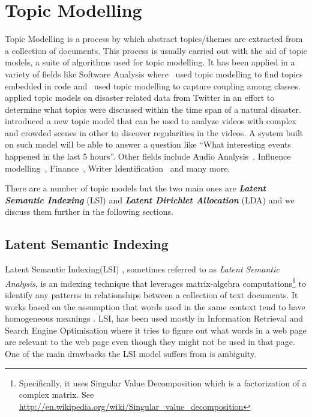 \section{Topic Modelling}
\label{sec:bg_topic_modelling}
Topic Modelling is a process by which abstract topics/themes are extracted from a collection of
documents. This process is usually carried out with the aid of topic models, a suite of algorithms
used for topic modelling. It has been applied in a variety of fields like Software Analysis
where~\citet{linstead2009software} used topic modelling to find topics embedded in code
and~\citet{gethers2010using} used topic modelling to capture coupling among
classes.~\citet{kireyev2009applications} applied topic models on disaster related data from Twitter
in an effort to determine what topics were discussed within the time span of a natural
disaster.~\citet{hospedales2009markov} introduced a new topic model that can be used to analyze
videos with complex and crowded scenes in other to discover regularities in the videos. A system
built on such model will be able to answer a question like ``What interesting events happened in the
last 5 hours''. Other fields include Audio Analysis~\citep{smaragdis2009topic}, Influence
modelling~\citep{gerrish2009modeling}, Finance~\citep{doyle2009financial}, Writer
Identification~\citep{bhardwaj2009writer} and many more.

There are a number of topic models but the two main ones are \textbf{\textit{Latent Semantic
Indexing}} (LSI) and \textbf{\textit{Latent Dirichlet Allocation}} (LDA) and we discuss them further
in the following sections.


\subsection{Latent Semantic Indexing}
\label{sub:bg_lsa}
Latent Semantic Indexing(LSI) \citep{hofmann1999probabilistic}, sometimes referred to as
\textit{Latent Semantic Analysis}, is an indexing technique that leverages matrix-algebra
computations\footnote{Specifically, it uses Singular Value Decomposition which is a factorization of
a complex matrix. See \url{http://en.wikipedia.org/wiki/Singular_value_decomposition}} to identify
any patterns in relationships between a collection of text documents. It works based on the
assumption that words used in the same context tend to have homogeneous meanings
\citep{deerwester1990indexing,dumais2004latent,landauer2006latent}. LSI, has been used mostly in
Information Retrieval and Search Engine Optimisation where it tries to figure out what words in a
web page are relevant to the web page even though they might not be used in that page. One of the
main drawbacks the LSI model suffers from is ambiguity.

